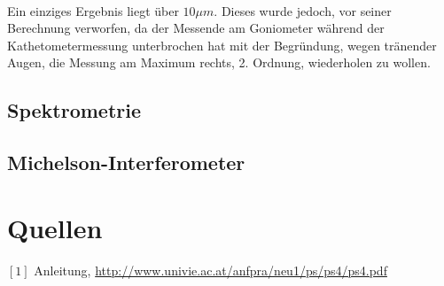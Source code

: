 \documentclass[12pt,a4paper]{article}
\begin{document}
\begin{multicols}{2}
\\
Ein einziges Ergebnis liegt über $10\mu m$. Dieses wurde jedoch, vor seiner Berechnung verworfen, da der Messende am Goniometer während der Kathetometermessung unterbrochen hat mit der Begründung, wegen tränender Augen, die Messung am Maximum rechts, 2. Ordnung, wiederholen zu wollen.\\



\subsection{Spektrometrie}


\subsection{Michelson-Interferometer}


\section{Quellen}
$[1]$ Anleitung, \url{http://www.univie.ac.at/anfpra/neu1/ps/ps4/ps4.pdf}\\
\end{multicols}
\end{document}
